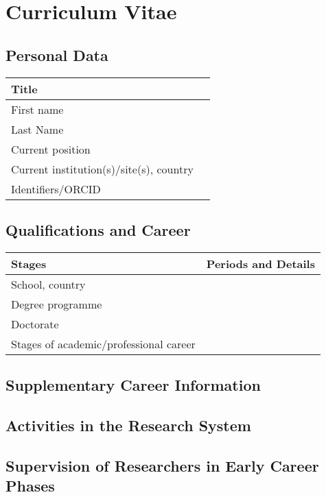 \documentclass{scrartcl}
\begin{document}
\section*{Curriculum Vitae}

\subsection*{Personal Data}

\begin{tabular}{|>{\raggedright}p{}|p{}|}
\hline
Title & \\
\hline
First name & \\
\hline
Last Name & \\
\hline
Current position &  \\
\hline
Current institution(s)/site(s), country & \\
\hline
Identifiers/ORCID & \\
\hline
\end{tabular}

\subsection*{Qualifications and Career}

\begin{tabular}{|>{\raggedright}p{}|p{}|}
\hline
\textbf{Stages} & \textbf{Periods and Details} \\
\hline
School, country & \\ %
\hline
Degree programme & \\
\hline
Doctorate & \\
\hline
Stages of academic/professional career & \\ %
\hline
\end{tabular}

\subsection*{Supplementary Career Information}

\subsection*{Activities in the Research System}

\subsection*{Supervision of Researchers in Early Career Phases}
\end{document}
